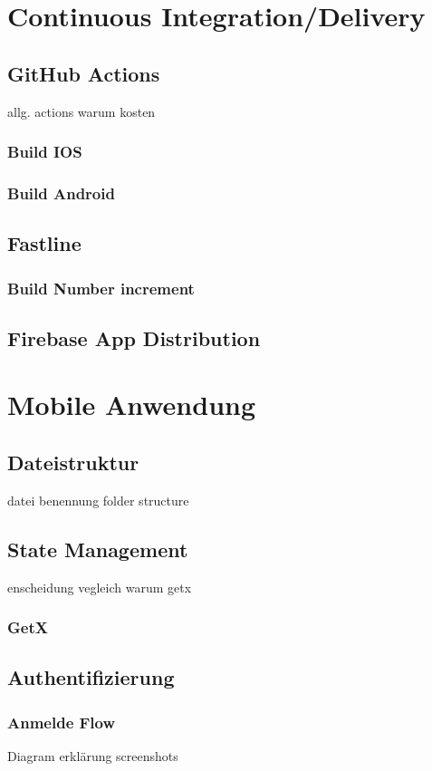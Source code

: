 \section{Continuous Integration/Delivery}
\subsection{GitHub Actions}
allg. actions warum kosten
\subsubsection{Build IOS}
\subsubsection{Build Android}

\subsection{Fastline}
\subsubsection{Build Number increment}
\subsection{Firebase App Distribution}

\section{Mobile Anwendung}
\subsection{Dateistruktur}
datei benennung folder structure
\subsection{State Management}
enscheidung vegleich warum getx
\subsubsection{GetX}

\subsection{Authentifizierung}
\subsubsection{Anmelde Flow}
Diagram
erklärung 
screenshots
